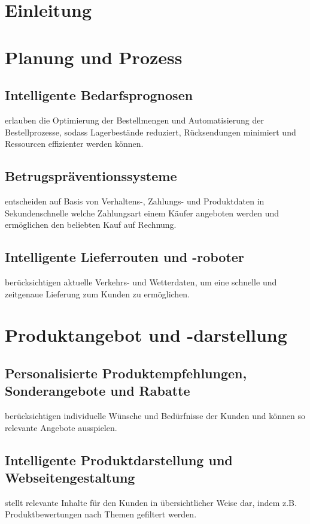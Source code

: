 \documentclass[twoside,twocolumn]{article}
\begin{document}
	
	\maketitle
	
	
	\section{Einleitung}
	
	
	\section{Planung und Prozess}
	\subsection{Intelligente Bedarfsprognosen}
	erlauben die Optimierung der Bestellmengen und Automatisierung der Bestellprozesse, sodass Lagerbestände reduziert, Rücksendungen minimiert und Ressourcen effizienter werden können.
	\subsection{Betrugspräventionssysteme}
	entscheiden auf Basis von Verhaltens-, Zahlungs- und Produktdaten in Sekundenschnelle welche Zahlungsart einem Käufer angeboten werden und ermöglichen den beliebten Kauf auf Rechnung.
	\subsection{Intelligente Lieferrouten und -roboter}
	berücksichtigen aktuelle Verkehrs- und Wetterdaten, um eine schnelle und zeitgenaue Lieferung zum Kunden zu ermöglichen.
	\section{Produktangebot und -darstellung}
	\subsection{Personalisierte Produktempfehlungen, Sonderangebote und Rabatte}
	berücksichtigen individuelle Wünsche und Bedürfnisse der Kunden und können so relevante Angebote ausspielen.
	\subsection{Intelligente Produktdarstellung und Webseitengestaltung}
	stellt relevante Inhalte für den Kunden in übersichtlicher Weise dar, indem z.B. Produktbewertungen nach Themen gefiltert werden.
\end{document}
